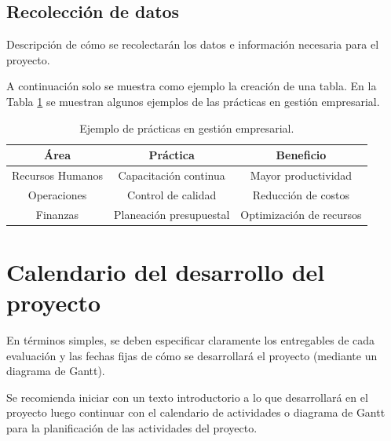 \subsection{Recolección de datos}
Descripción de cómo se recolectarán los datos e información necesaria para el proyecto.

A continuación solo se muestra como ejemplo la creación de una tabla. En la Tabla \ref{tab:ejem1} se muestran algunos ejemplos de las prácticas en gestión empresarial.

\begin{table}[ht]
\centering
\caption{Ejemplo de prácticas en gestión empresarial.}
\begin{tabular}{|c|c|c|}
\hline
\textbf{Área} & \textbf{Práctica} & \textbf{Beneficio} \\ \hline
Recursos Humanos & Capacitación continua & Mayor productividad \\ \hline
Operaciones & Control de calidad & Reducción de costos \\ \hline
Finanzas & Planeación presupuestal & Optimización de recursos \\ \hline
\end{tabular}
\label{tab:ejem1}
\end{table}

\section{Calendario del desarrollo del proyecto}

En términos simples, se deben especificar claramente los entregables de cada evaluación y las fechas fijas de cómo se desarrollará el proyecto (mediante un diagrama de Gantt).

Se recomienda iniciar con un texto introductorio a lo que desarrollará en el proyecto luego continuar con el calendario de actividades o diagrama de Gantt para la planificación de las actividades del proyecto.